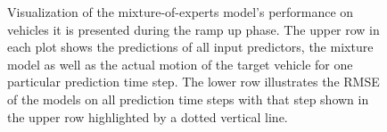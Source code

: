 \begin{figure}[t!]
    \centering
    \vspace{-0.5cm}
    \vspace{-0.5cm}
    \caption{Visualization of the mixture-of-experts model's performance on vehicles it is presented during the ramp up phase.
    The upper row in each plot shows the predictions of all input predictors, the mixture model as well as the actual motion of the target vehicle for one particular prediction time step.
The lower row illustrates the \ac{RMSE} of the models on all prediction time steps with that step shown in the upper row highlighted by a dotted vertical line.}
\label{fig:mix_train_obj}
\end{figure}

